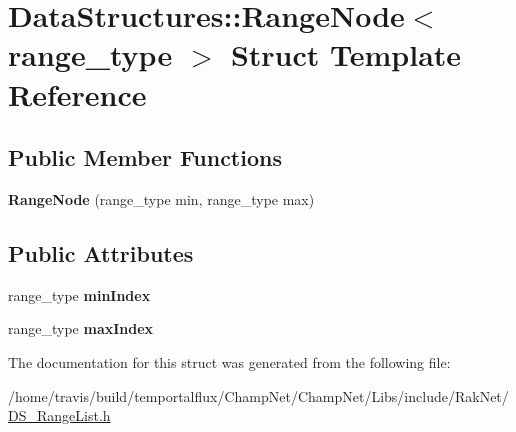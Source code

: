 \hypertarget{struct_data_structures_1_1_range_node}{\section{Data\-Structures\-:\-:Range\-Node$<$ range\-\_\-type $>$ Struct Template Reference}
\label{struct_data_structures_1_1_range_node}
}
\subsection*{Public Member Functions}
\begin{DoxyCompactItemize}
\item 
\hypertarget{struct_data_structures_1_1_range_node_a6adc5bdb28b073a00cccdff7f36da3b0}{{\bfseries Range\-Node} (range\-\_\-type min, range\-\_\-type max)}\label{struct_data_structures_1_1_range_node_a6adc5bdb28b073a00cccdff7f36da3b0}

\end{DoxyCompactItemize}
\subsection*{Public Attributes}
\begin{DoxyCompactItemize}
\item 
\hypertarget{struct_data_structures_1_1_range_node_a836ce2252f7eb8fba94ffd98cf26f8f3}{range\-\_\-type {\bfseries min\-Index}}\label{struct_data_structures_1_1_range_node_a836ce2252f7eb8fba94ffd98cf26f8f3}

\item 
\hypertarget{struct_data_structures_1_1_range_node_a087fd2d24add7891e90ab545d38e8040}{range\-\_\-type {\bfseries max\-Index}}\label{struct_data_structures_1_1_range_node_a087fd2d24add7891e90ab545d38e8040}

\end{DoxyCompactItemize}


The documentation for this struct was generated from the following file\-:\begin{DoxyCompactItemize}
\item 
/home/travis/build/temportalflux/\-Champ\-Net/\-Champ\-Net/\-Libs/include/\-Rak\-Net/\hyperlink{_d_s___range_list_8h}{D\-S\-\_\-\-Range\-List.\-h}\end{DoxyCompactItemize}
